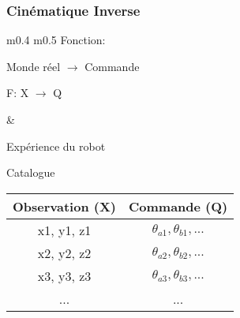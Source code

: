 \documentclass[french]{beamer}
\begin{document}
\begin{frame}
    \frametitle{Cinématique Inverse}

    \center
    \begin{tabular}{m{} m{}}
        Fonction: 
        
        Monde réel $\rightarrow$ Commande

        \vspace{3mm}

        \center
        \Large
        F: 
        \large
        X $\rightarrow$ Q \nonumber

        \vspace{20mm}

        \phantom{}

        &

        \phantom{}

        \vspace{1mm}

        \center
        Expérience du robot

        \vspace{3mm}

        Catalogue

        \vspace{2mm}

        \begin{tabular}{||c | c ||}
            \hline
            Observation (X) & Commande (Q) \\
            \hline
            x1, y1, z1 & $\theta_{a1}, \theta_{b1}, ...$\\
            x2, y2, z2 & $\theta_{a2}, \theta_{b2}, ...$\\
            x3, y3, z3 & $\theta_{a3}, \theta_{b3}, ...$\\
            ... & ...\\
            \hline
        \end{tabular}
    \end{tabular}

\end{frame}

\end{document}

